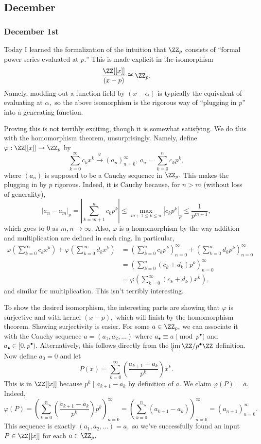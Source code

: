 \subsection{December}

\subsubsection{December 1st}
Today I learned the formalization of the intuition that $\ZZ_p$ consists of ``formal power series evaluated at $p.$'' This is made explicit in the isomorphism
\[\frac{\ZZ[[x]]}{(x-p)}\cong\ZZ_p.\]
Namely, modding out a function field by $(x-\alpha)$ is typically the equivalent of evaluating at $\alpha,$ so the above isomorphism is the rigorous way of ``plugging in $p$'' into a generating function.

Proving this is not terribly exciting, though it is somewhat satisfying. We do this with the homomorphism theorem, unsurprisingly. Namely, define $\varphi:\ZZ[[x]]\to\ZZ_p$ by
\[\sum_{k=0}^\infty c_kx^k\stackrel\varphi\longmapsto(a_n)_{n=0}^\infty,\,a_n=\sum_{k=0}^nc_kp^k,\]
where $(a_n)$ is supposed to be a Cauchy sequence in $\ZZ_p.$ This makes the plugging in by $p$ rigorous. Indeed, it is Cauchy because, for $n>m$ (without loss of generality),
\[|a_n-a_m|_p=\left|\sum_{k=m+1}^nc_kp^k\right|\le\max_{m+1\le k\le n}\left|c_kp^k\right|_p\le\frac1{p^{m+1}},\]
which goes to $0$ as $m,n\to\infty.$ Also, $\varphi$ is a homomorphism by the way addition and multiplication are defined in each ring. In particular,
\begin{align*}
    \varphi\left(\sum_{k=0}^\infty c_kx^k\right)+\varphi\left(\sum_{k=0}^\infty d_kx^k\right)&=\left(\sum_{k=0}^nc_kp^k\right)_{n=0}^\infty+\left(\sum_{k=0}^nd_kp^k\right)_{n=0}^\infty \\
    &=\left(\sum_{k=0}^n(c_k+d_k)p^k\right)_{n=0}^\infty \\
    &=\varphi\left(\sum_{k=0}^\infty(c_k+d_k)x^k\right),
\end{align*}
and similar for multiplication. This isn't terribly interesting.

To show the desired isomorphism, the interesting parts are showing that $\varphi$ is surjective and with kernel $(x-p),$ which will finish by the homomorphism theorem. Showing surjectivity is easier. For some $a\in\ZZ_p,$ we can associate it with the Cauchy sequence $a=(a_1,a_2,\ldots)$ where $a_\bullet\equiv a\pmod{p^\bullet}$ and $a_\bullet\in[0,p^\bullet).$ Alternatively, this follows directly from the $\varprojlim\ZZ/p^\bullet\ZZ$ definition. Now define $a_0=0$ and let
\[P(x)=\sum_{k=0}^\infty\left(\frac{a_{k+1}-a_k}{p^k}\right)x^k.\]
This is in $\ZZ[[x]]$ because $p^k\mid a_{k+1}-a_k$ by definition of $a.$ We claim $\varphi(P)=a.$ Indeed,
\[\varphi(P)=\left(\sum_{k=0}^n\left(\frac{a_{k+1}-a_k}{p^k}\right)p^k\right)_{n=0}^\infty=\left(\sum_{k=0}^n(a_{k+1}-a_k)\right)_{n=0}^\infty=(a_{n+1})_{n=0}^\infty.\]
This sequence is exactly $(a_1,a_2,\ldots)=a,$ so we've successfully found an input $P\in\ZZ[[x]]$ for each $a\in\ZZ_p.$

